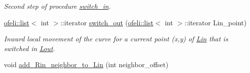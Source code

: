 \begin{DoxyCompactItemize}
\begin{DoxyCompactList}\small\item\em Second step of procedure \hyperlink{classofeli_1_1_active_contour_a7d9a557b580af708155ff4ab8bbfd73b}{switch\-\_\-in}. \end{DoxyCompactList}\item 
\hyperlink{classofeli_1_1list}{ofeli\-::list}$<$ int $>$\-::iterator \hyperlink{classofeli_1_1_active_contour_a98af656dfc038e6f03c9e4bb67e39bd0}{switch\-\_\-out} (\hyperlink{classofeli_1_1list}{ofeli\-::list}$<$ int $>$\-::iterator Lin\-\_\-point)
\begin{DoxyCompactList}\small\item\em Inward local movement of the curve for a current point ({\itshape x},{\itshape y}) of \hyperlink{classofeli_1_1_active_contour_a7662d4f5c8b87d3e642b08b7e341bd79}{Lin} that is switched in \hyperlink{classofeli_1_1_active_contour_a31e0eb18a7ea6ae90acf66ed018fcd85}{Lout}. \end{DoxyCompactList}\item 
\hypertarget{classofeli_1_1_active_contour_a4c5a0d11f457bc694fb801a153bcd065}{void \hyperlink{classofeli_1_1_active_contour_a4c5a0d11f457bc694fb801a153bcd065}{add\-\_\-\-Rin\-\_\-neighbor\-\_\-to\-\_\-\-Lin} (int neighbor\-\_\-offset)}\label{classofeli_1_1_active_contour_a4c5a0d11f457bc694fb801a153bcd065}


\end{DoxyCompactItemize}
